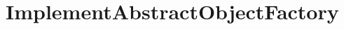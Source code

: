 \section{ImplementAbstractObjectFactory}
\label{feature:ImplementAbstractObjectFactory}
\ClearAPI
\TODO